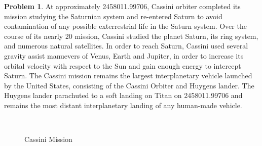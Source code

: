 \documentclass[10pt]{article}
\theoremstyle{definition}
\newtheorem{prob}{Problem}[section]
\begin{document}
\clearpage\newpage
\begin{prob}
    At approximately \SI{2458011.99706}{\julianday}, Cassini orbiter completed its mission studying the Saturnian system and re-entered Saturn to avoid contamination of any possible exterrestrial life in the Saturn system.
    Over the course of its nearly \SI{20}{\year} mission, Cassini studied the planet Saturn, its ring system, and numerous natural satellites. 
    In order to reach Saturn, Cassini used several gravity assist manuevers of Venus, Earth and Jupiter, in order to increase its orbital velocity with respect to the Sun and gain enough energy to intercept Saturn. 
    The Cassini mission remains the largest interplanetary vehicle launched by the United States, consisting of the Cassini Orbiter and Huygens lander.
    The Huygens lander parachuted to a soft landing on Titan on \SI{2458011.99706}{\julianday} and remains the most distant interplanetary landing of any human-made vehicle.
    \begin{figure}[htbp]
        \centering
        ~
        \\
       \caption{Cassini Mission} 
    \end{figure}


\end{prob}
\end{document}
